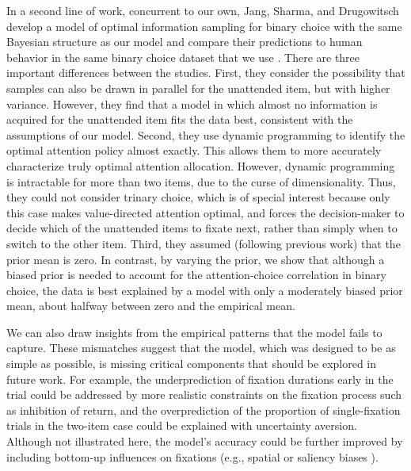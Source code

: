 In a second line of work, concurrent to our own, Jang, Sharma, and Drugowitsch \citep{jang2021optimal} develop a model of optimal information sampling for binary choice with the same Bayesian structure as our model and compare their predictions to human behavior in the same binary choice dataset that we use \citep{krajbich2010visual}. There are three important differences between the studies. First, they consider the possibility that samples can also be drawn in parallel for the unattended item, but with higher variance. However, they find that a model in which almost no information is acquired for the unattended item fits the data best, consistent with the assumptions of our model. Second, they use dynamic programming to identify the optimal attention policy almost exactly. This allows them to more accurately characterize truly optimal attention allocation. However, dynamic programming is intractable for more than two items, due to the curse of dimensionality. Thus, they could not consider trinary choice, which is of special interest because only this case makes value-directed attention optimal, and forces the decision-maker to decide which of the unattended items to fixate next, rather than simply when to switch to the other item. Third, they assumed (following previous work) that the prior mean is zero. In contrast, by varying the prior, we show that although a biased prior is needed to account for the attention-choice correlation in binary choice, the data is best explained by a model with only a moderately biased prior mean, about halfway between zero and the empirical mean.

We can also draw insights from the empirical patterns that the model fails to capture. These mismatches suggest that the model, which was designed to be as simple as possible, is missing critical components that should be explored in future work. For example, the underprediction of fixation durations early in the trial could be addressed by more realistic constraints on the fixation process such as inhibition of return, and the overprediction of the proportion of single-fixation trials in the two-item case could be explained with uncertainty aversion. Although not illustrated here, the model's accuracy could be further improved by including bottom-up influences on fixations (e.g., spatial or saliency biases \citep{towal2013simultaneous,itti2000saliencybased}).

